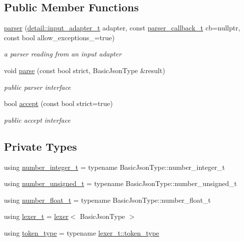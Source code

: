 \subsection*{Public Member Functions}
\begin{DoxyCompactItemize}
\item 
\hyperlink{classnlohmann_1_1detail_1_1parser_a693aa2a6c0cc665e0e45bacf055460e6}{parser} (\hyperlink{namespacenlohmann_1_1detail_ae132f8cd5bb24c5e9b40ad0eafedf1c2}{detail\+::input\+\_\+adapter\+\_\+t} adapter, const \hyperlink{classnlohmann_1_1detail_1_1parser_ad250ad4f2b4af4a497e727c963162ff1}{parser\+\_\+callback\+\_\+t} cb=nullptr, const bool allow\+\_\+exceptions\+\_\+=true)
\begin{DoxyCompactList}\small\item\em a parser reading from an input adapter \end{DoxyCompactList}\item 
void \hyperlink{classnlohmann_1_1detail_1_1parser_a14338d8f3174601c0b2b7ef28752ab17}{parse} (const bool strict, Basic\+Json\+Type \&result)
\begin{DoxyCompactList}\small\item\em public parser interface \end{DoxyCompactList}\item 
bool \hyperlink{classnlohmann_1_1detail_1_1parser_a20997b42262856935b60fc91bf05bf3f}{accept} (const bool strict=true)
\begin{DoxyCompactList}\small\item\em public accept interface \end{DoxyCompactList}\end{DoxyCompactItemize}
\subsection*{Private Types}
\begin{DoxyCompactItemize}
\item 
using \hyperlink{classnlohmann_1_1detail_1_1parser_aa0362897269e0a7e50ae07be05f42d8e}{number\+\_\+integer\+\_\+t} = typename Basic\+Json\+Type\+::number\+\_\+integer\+\_\+t
\item 
using \hyperlink{classnlohmann_1_1detail_1_1parser_a3773ccef366c61da2e6a8c0eda36d0ec}{number\+\_\+unsigned\+\_\+t} = typename Basic\+Json\+Type\+::number\+\_\+unsigned\+\_\+t
\item 
using \hyperlink{classnlohmann_1_1detail_1_1parser_a8ca8e734da0632c2731fc3b9547dcf28}{number\+\_\+float\+\_\+t} = typename Basic\+Json\+Type\+::number\+\_\+float\+\_\+t
\item 
using \hyperlink{classnlohmann_1_1detail_1_1parser_a16030c5af158a94d1c799f82ff3a0147}{lexer\+\_\+t} = \hyperlink{classnlohmann_1_1detail_1_1lexer}{lexer}$<$ Basic\+Json\+Type $>$
\item 
using \hyperlink{classnlohmann_1_1detail_1_1parser_a21d247111b332785b7acf3f8e487d117}{token\+\_\+type} = typename \hyperlink{classnlohmann_1_1detail_1_1lexer_a3f313cdbe187cababfc5e06f0b69b098}{lexer\+\_\+t\+::token\+\_\+type}
\end{DoxyCompactItemize}
